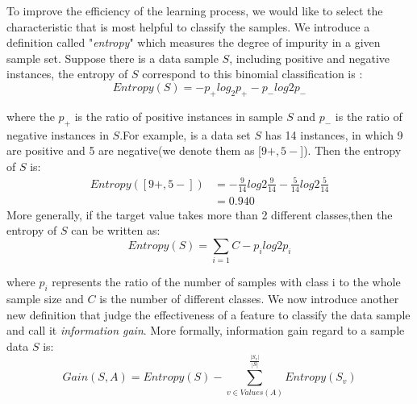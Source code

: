 To improve the efficiency of the learning process, we would like to select the characteristic that is most helpful to classify the samples. We introduce a definition called "\textit{entropy}" which measures the degree of impurity in a given sample set. Suppose there is a data sample $S$, including positive and negative instances, the entropy of $S$ correspond to this binomial classification is :
\begin{equation}
Entropy(S)=-p_+log_2 p_+-p_-log2p_-
\end{equation} 

where the $p_+$ is the ratio of positive instances in sample $S$ and $p_-$ is the ratio of negative instances in $S$.For example, is a data set $S$ has 14 instances, in which 9 are positive and 5 are negative(we denote them as [$9+,5-$]). Then the entropy of $S$ is:
\begin{equation}\label{en:entropy}
\begin{aligned}
Entropy([9+,5-])&=-\frac{9}{14}log2 \frac{9}{14}-\frac{5}{14}log2 \frac{5}{14}\\
&=0.940
\end{aligned}
\end{equation}
More generally, if the target value takes more than 2 different classes,then the entropy of $S$ can be written as:
\begin{equation}	
Entropy(S) = \sum_{i=1}{C}-p_ilog2 p_i 	
\end{equation}

where $p_i$ represents the ratio of the number of samples with class i to the whole sample size and $C$ is the number of different classes. We now introduce another new definition that judge the effectiveness of a feature to classify the data sample and call it \textit{information gain}. More formally, information gain regard to a sample data $S$ is:
\begin{equation}
Gain(S,A)=Entropy (S) -\sum_{v\in Values(A)}^{\frac{|S_v|}{|S|}}Entropy(S_v)
\end{equation}

